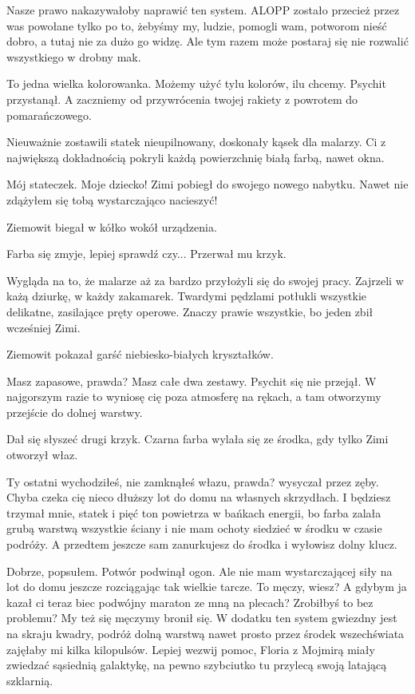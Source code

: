 \ds{} Nasze prawo nakazywałoby naprawić ten system. ALOPP zostało przecież przez was powołane tylko po to, żebyśmy my, ludzie, pomogli wam, potworom nieść dobro, a tutaj nie za dużo go widzę. 
Ale tym razem może postaraj się nie rozwalić wszystkiego w drobny mak. \de{}

\ds{} To jedna wielka kolorowanka. Możemy użyć tylu kolorów, ilu chcemy. \dm{} Psychit przystanął. \dm{} A zaczniemy od przywrócenia twojej rakiety z powrotem do pomarańczowego. \de{}

Nieuważnie zostawili statek nieupilnowany, doskonały kąsek dla malarzy.
Ci z największą dokładnością pokryli każdą powierzchnię białą farbą, nawet okna.

\ds{} Mój stateczek. Moje dziecko! \dm{} Zimi pobiegł do swojego nowego nabytku. \dm{} Nawet nie zdążyłem się tobą wystarczająco nacieszyć! \de{}

Ziemowit biegał w kółko wokół urządzenia.

\ds{} Farba się zmyje, lepiej sprawdź czy... \dm{} Przerwał mu krzyk. \de{}

Wygląda na to, że malarze aż za bardzo przyłożyli się do swojej pracy. 
Zajrzeli w każą dziurkę, w każdy zakamarek.
Twardymi pędzlami potłukli wszystkie delikatne, zasilające pręty operowe.
Znaczy prawie wszystkie, bo jeden zbił wcześniej Zimi.

Ziemowit pokazał garść niebiesko-białych kryształków.

\ds{} Masz zapasowe, prawda? Masz całe dwa zestawy. \dm{} Psychit się nie przejął. \dm{}
W najgorszym razie to wyniosę cię poza atmosferę na rękach, a tam otworzymy przejście do dolnej warstwy. \de{}

Dał się słyszeć drugi krzyk. Czarna farba wylała się ze środka, gdy tylko Zimi otworzył właz.

\ds{} Ty ostatni wychodziłeś, nie zamknąłeś włazu, prawda? \dm{} wysyczał przez zęby. \dm{} Chyba czeka cię nieco dłuższy lot do domu na własnych skrzydłach. 
I będziesz trzymał mnie, statek i pięć ton powietrza w bańkach energii, bo farba zalała grubą warstwą wszystkie ściany i nie mam ochoty siedzieć w środku w czasie podróży.
A przedtem jeszcze sam zanurkujesz do środka i wyłowisz dolny klucz. \de{}

\ds{} Dobrze, popsułem. \dm{} Potwór podwinął ogon. \dm{} Ale nie mam wystarczającej siły na lot do domu jeszcze rozciągając tak wielkie tarcze. To męczy, wiesz? 
A gdybym ja kazał ci teraz biec podwójny maraton ze mną na plecach? Zrobiłbyś to bez problemu? My też się męczymy \dm{} bronił się. \dm{} 
W dodatku ten system gwiezdny jest na skraju kwadry, podróż dolną warstwą nawet prosto przez środek wszechświata zajęłaby mi kilka kilopulsów. 
Lepiej wezwij pomoc, Floria z Mojmirą miały zwiedzać sąsiednią galaktykę, na pewno szybciutko tu przylecą swoją latającą szklarnią. \de{}

